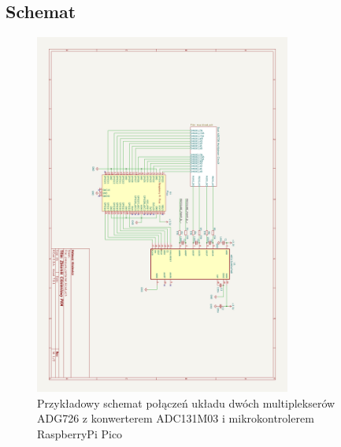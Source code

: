 \documentclass[12pt]{article}
\begin{document}
	\subsection{Schemat}
	\begin{figure}[H]
		\centering
		\includegraphics[width=0.75\textwidth, center]{schematic}
		\caption{Przykładowy schemat połączeń układu dwóch multiplekserów ADG726 z konwerterem ADC131M03 i mikrokontrolerem RaspberryPi Pico}
		\label{rys:sch}
	\end{figure}
\end{document}
